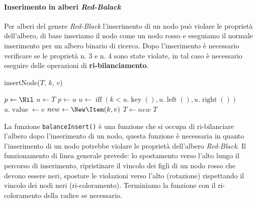         \paragraph{Inserimento in alberi \textit{Red-Balack}}
            Per alberi del genere \textit{Red-Black} l'inserimento di un nodo può violare le proprietà dell'albero, di base inseriamo il nodo come un nodo rosso e eseguiamo il normale inserimento per un albero binario di ricerca. Dopo l'inserimento è necessario verificare se le proprietà n. 3 e n. 4 sono state violate, in tal caso è necessario eseguire delle operazioni di \textbf{ri-bilanciamento}.
            \begin{algorithm}
                \caption{insertNode(\Tree $ T $, \Item $ k $, \Item $ v $)}
                \begin{algorithmic}
                    \State \Tree $ p \gets \Nil $ 
                    \State \Tree $ u \gets T $
                     
                        \State $ p \gets u $
                        \State $ u \gets \operatorname{iff}(k < u.\operatorname{key}(), u.\operatorname{left}(), u.\operatorname{right}()) $
                    \EndWhile
                        \State $ u.\operatorname{value} \gets v $ 
                    \Else
                        \State \Tree $ new \gets \New \Item(k, v)$
                        \State {}
                        \State {}
                            \State $ T \gets new $ 
                        \EndIf
                    \EndIf
                    \State \Return $ T $ 
                \end{algorithmic}
            \end{algorithm}
            La funzione \texttt{balanceInsert()} è una funzione che si occupa di ri-bilanciare l'albero dopo l'inserimento di un nodo, questa funzione è necessaria in quanto l'inserimento di un nodo potrebbe violare le proprietà dell'albero \textit{Red-Black}.\newline
            Il funzionamento di linea generale prevede: lo spostamento verso l'alto lungo il percorso di inserimento, ripristinare il vincolo dei figli di un nodo rosso che devono essere neri, spostare le violazioni verso l'alto (rotazione) rispettando il vincolo dei nodi neri (ri-coloramento). Terminiamo la funzione con il ri-coloramento della radice se necessario.

